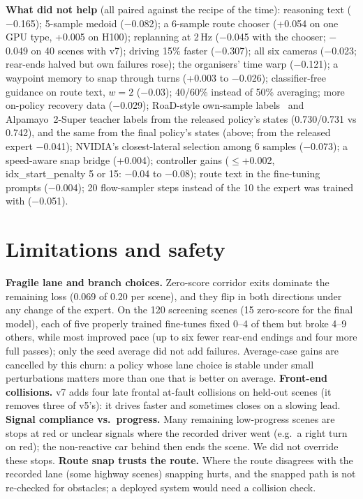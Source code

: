 \documentclass{article}
\begin{document}
\textbf{What did not help} (all paired against the recipe of the time): reasoning text ($-$0.165); 5-sample medoid
($-$0.082); a 6-sample route chooser (+0.054 on one GPU type, +0.005 on H100); replanning at 2\,Hz ($-$0.045 with the chooser;
$-$0.049 on 40 scenes with v7); driving 15\% faster ($-$0.307); all six cameras ($-$0.023; rear-ends halved but own
failures rose); the organisers' time warp ($-$0.121); a waypoint memory to snap through turns (+0.003 to $-$0.026);
classifier-free guidance on route text, $w{=}2$ ($-$0.03); 40/60\% instead of 50\% averaging; more on-policy recovery
data ($-$0.029); RoaD-style own-sample labels~\cite{road} and Alpamayo~2-Super teacher labels from the released policy's
states (0.730/0.731 vs 0.742), and the same from the final policy's states (above; from the released expert $-$0.041);
NVIDIA's closest-lateral selection among 6 samples ($-$0.073);
a speed-aware snap bridge (+0.004); controller gains ($\le$+0.002, idx\_start\_penalty 5 or 15: $-$0.04 to $-$0.08);
route text in the fine-tuning prompts ($-$0.004); 20 flow-sampler steps instead of the 10 the expert was trained with
($-$0.051).

\section{Limitations and safety}
\textbf{Fragile lane and branch choices.} Zero-score corridor exits dominate the remaining loss (0.069 of 0.20 per
scene), and they flip in both directions under any change of the expert. On the 120 screening scenes (15 zero-score for
the final model), each of five properly trained fine-tunes fixed 0--4 of them but broke 4--9 others, while most
improved pace (up to six fewer rear-end endings and four more full passes); only the seed average did not add failures.
Average-case gains are cancelled by this churn: a policy whose lane choice is stable under small perturbations matters
more than one that is better on average. \textbf{Front-end collisions.} v7 adds four late frontal at-fault collisions on held-out scenes (it removes three of
v5's): it drives faster and sometimes closes on a slowing lead. \textbf{Signal compliance vs.\ progress.} Many
remaining low-progress scenes are stops at red or unclear signals where the recorded driver went (e.g.\ a right turn
on red); the non-reactive car behind then ends the scene. We did not override these stops. \textbf{Route snap trusts
the route.} Where the route disagrees with the recorded lane (some highway scenes) snapping hurts, and the snapped
path is not re-checked for obstacles; a deployed system would need a collision check.
\end{document}
